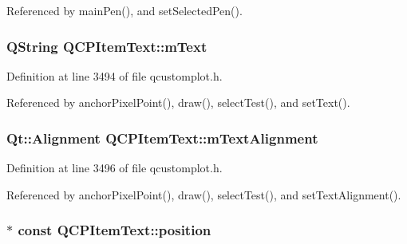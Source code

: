 Referenced by main\+Pen(), and set\+Selected\+Pen().

\hypertarget{class_q_c_p_item_text_a2dec3e08c11f51639629374ecec3bd62}{}
\subsubsection[{m\+Text}]{\setlength{\rightskip}{0pt plus 5cm}Q\+String Q\+C\+P\+Item\+Text\+::m\+Text\hspace{0.3cm}{\ttfamily [protected]}}\label{class_q_c_p_item_text_a2dec3e08c11f51639629374ecec3bd62}


Definition at line 3494 of file qcustomplot.\+h.



Referenced by anchor\+Pixel\+Point(), draw(), select\+Test(), and set\+Text().

\hypertarget{class_q_c_p_item_text_acdb2e50c38e83da00f083771efbd213f}{}
\subsubsection[{m\+Text\+Alignment}]{\setlength{\rightskip}{0pt plus 5cm}Qt\+::\+Alignment Q\+C\+P\+Item\+Text\+::m\+Text\+Alignment\hspace{0.3cm}{\ttfamily [protected]}}\label{class_q_c_p_item_text_acdb2e50c38e83da00f083771efbd213f}


Definition at line 3496 of file qcustomplot.\+h.



Referenced by anchor\+Pixel\+Point(), draw(), select\+Test(), and set\+Text\+Alignment().

\hypertarget{class_q_c_p_item_text_a0d228a00e819022b5690c65762721129}{}
\subsubsection[{position}]{$\ast$ const Q\+C\+P\+Item\+Text\+::position}\label{class_q_c_p_item_text_a0d228a00e819022b5690c65762721129}


